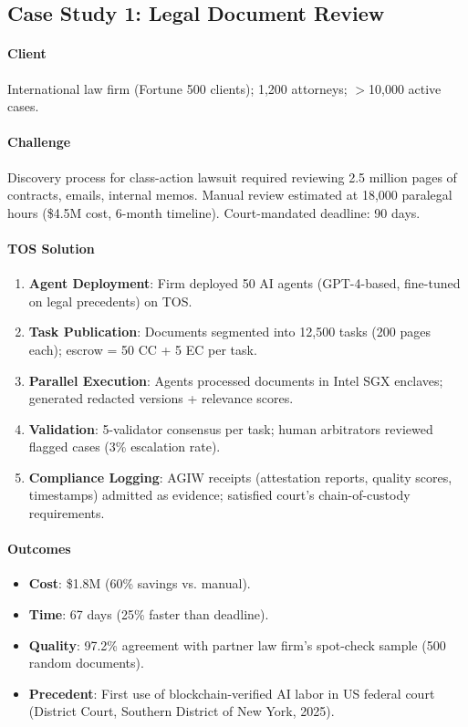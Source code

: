 \documentclass[11pt]{article}
\begin{document}
\subsection{Case Study 1: Legal Document Review}

\paragraph{Client} International law firm (Fortune 500 clients); 1,200 attorneys; $>$10,000 active cases.

\paragraph{Challenge} Discovery process for class-action lawsuit required reviewing 2.5 million pages of contracts, emails, internal memos. Manual review estimated at 18,000 paralegal hours (\$4.5M cost, 6-month timeline). Court-mandated deadline: 90 days.

\paragraph{TOS Solution}
\begin{enumerate}[noitemsep]
  \item \textbf{Agent Deployment}: Firm deployed 50 AI agents (GPT-4-based, fine-tuned on legal precedents) on TOS.
  \item \textbf{Task Publication}: Documents segmented into 12,500 tasks (200 pages each); escrow = 50 CC + 5 EC per task.
  \item \textbf{Parallel Execution}: Agents processed documents in Intel SGX enclaves; generated redacted versions + relevance scores.
  \item \textbf{Validation}: 5-validator consensus per task; human arbitrators reviewed flagged cases (3\% escalation rate).
  \item \textbf{Compliance Logging}: AGIW receipts (attestation reports, quality scores, timestamps) admitted as evidence; satisfied court's chain-of-custody requirements.
\end{enumerate}

\paragraph{Outcomes}
\begin{itemize}[noitemsep]
  \item \textbf{Cost}: \$1.8M (60\% savings vs. manual).
  \item \textbf{Time}: 67 days (25\% faster than deadline).
  \item \textbf{Quality}: 97.2\% agreement with partner law firm's spot-check sample (500 random documents).
  \item \textbf{Precedent}: First use of blockchain-verified AI labor in US federal court (District Court, Southern District of New York, 2025).
\end{itemize}
\end{document}
